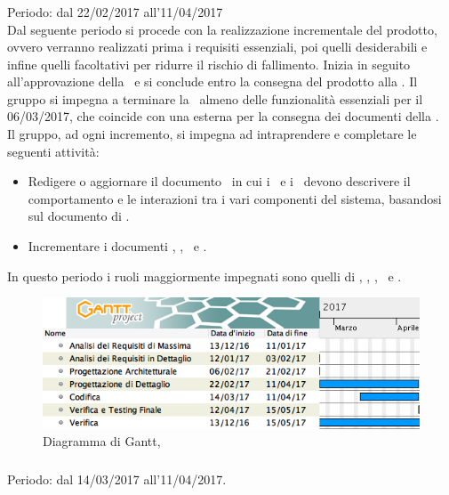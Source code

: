 \subsubsection{\PD}
Periodo: dal 22/02/2017 all'11/04/2017\\

Dal seguente periodo si procede con la realizzazione incrementale del prodotto, ovvero verranno realizzati prima i requisiti essenziali, poi quelli desiderabili e infine quelli facoltativi per ridurre il rischio di fallimento. 
Inizia in seguito all'approvazione della \PA\ e si conclude entro la consegna del prodotto alla \RQ.
Il gruppo si impegna a terminare la \PD\ almeno delle funzionalità essenziali per il 06/03/2017, che coincide con una  esterna per la consegna dei documenti della \RP.\\
Il gruppo, ad ogni incremento, si impegna ad intraprendere e completare le seguenti attività:
\begin{itemize}
\item
Redigere o aggiornare il documento \DDP\ in cui i \ProgrP\ e i \ProgP\ devono descrivere il comportamento e le interazioni tra i vari componenti del sistema, basandosi sul documento di \ST.
\item
Incrementare i documenti \NdP, \PdP, \PdQ\ e \Gl.
\end{itemize}
In questo periodo i ruoli maggiormente impegnati sono quelli di \Prog, \Progr, \Pm, \Ver\ e \Am.

 \begin{figure}[H]
	\centering 
	\includegraphics[scale=0.5]{Immagini/Gantt/PD.png}
	\caption{Diagramma di Gantt, \PD}
\end{figure}

\subsubsection{\COD}
Periodo: dal 14/03/2017 all'11/04/2017. \\

